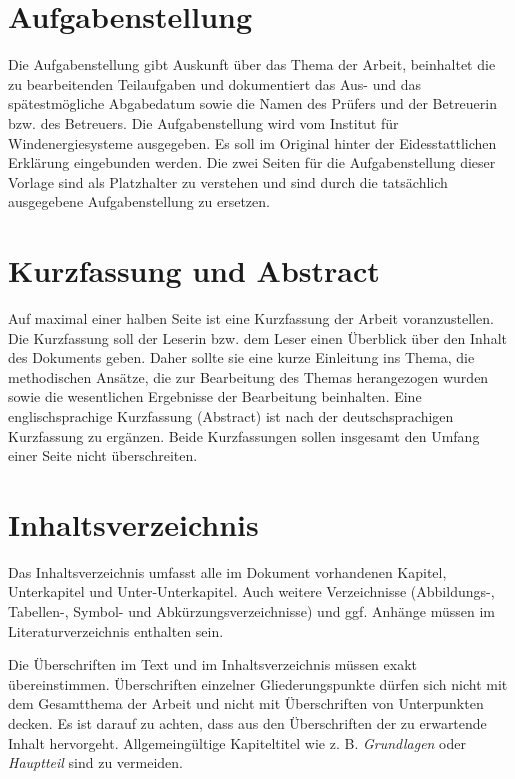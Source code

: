 \section{Aufgabenstellung}
\label{sec:Aufgabe}

Die Aufgabenstellung gibt Auskunft über das Thema der Arbeit, beinhaltet die zu bearbeitenden Teilaufgaben und dokumentiert das Aus- und das spätestmögliche Abgabedatum sowie die Namen des Prüfers und der Betreuerin bzw. des Betreuers. Die Aufgabenstellung wird vom Institut für Windenergiesysteme ausgegeben. Es soll im Original hinter der Eidesstattlichen Erklärung eingebunden werden. Die zwei Seiten für die Aufgabenstellung dieser Vorlage sind als Platzhalter zu verstehen und sind durch die tatsächlich ausgegebene Aufgabenstellung zu ersetzen. 

\section{Kurzfassung und Abstract}
\label{sec:Abstract_DE}

Auf maximal einer halben Seite ist eine Kurzfassung der Arbeit voranzustellen. Die Kurzfassung soll der Leserin bzw. dem Leser einen Überblick über den Inhalt des Dokuments geben. Daher sollte sie eine kurze Einleitung ins Thema, die methodischen Ansätze, die zur Bearbeitung des Themas herangezogen wurden sowie die wesentlichen Ergebnisse der Bearbeitung beinhalten. Eine englischsprachige Kurzfassung (Abstract) ist nach der deutschsprachigen Kurzfassung zu ergänzen. Beide Kurzfassungen sollen insgesamt den Umfang einer Seite nicht überschreiten.

\section{Inhaltsverzeichnis}
\label{sec:Inhalt}

Das Inhaltsverzeichnis umfasst alle im Dokument vorhandenen Kapitel, Unterkapitel und Unter-Unterkapitel. Auch weitere Verzeichnisse (Abbildungs-, Tabellen-, Symbol- und Abkürzungsverzeichnisse) und ggf. Anhänge müssen im Literaturverzeichnis enthalten sein. 

Die Überschriften im Text und im Inhaltsverzeichnis müssen exakt übereinstimmen. Überschriften einzelner Gliederungspunkte dürfen sich nicht mit dem Gesamtthema der Arbeit und nicht mit Überschriften von Unterpunkten decken. Es ist darauf zu achten, dass aus den Überschriften der zu erwartende Inhalt hervorgeht. Allgemeingültige Kapiteltitel wie z. B. \textit{Grundlagen} oder \textit{Hauptteil} sind zu vermeiden.

